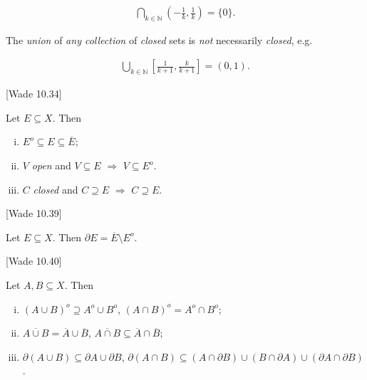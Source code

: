 \documentclass[10pt]{article} %
\newcommand{\cw}[1]{[Wade #1]}
\begin{document}
\begin{multicols}{3}
\begin{remark}{10.32}{}
        \begin{align*}
            \bigcap_{k \in \mathbb{N}} \left(-\frac{1}{k},\frac{1}{k}\right) = \{0\}.
        \end{align*}

    The \emph{union} of \emph{any collection} of \emph{closed} sets is \emph{not} necessarily \emph{closed}, e.g.

        \begin{align*}
            \bigcup_{k \in \mathbb{N}} \left[\frac{1}{k + 1},\frac{k}{k + 1}\right] = (0,1).
        \end{align*}

\end{remark}

\begin{theorem}{\cw{10.34}}{}

    Let $E \subseteq X$. Then

        \begin{enumerate}[i)]
            \setlength{\parskip}{0em}
            \item $E^o \subseteq E \subseteq \overline{E}$;
            \item $V$ \emph{open} and $V \subseteq E$ $\Rightarrow$ $V \subseteq E^o$.
            \item $C$ \emph{closed} and $C \supseteq E$ $\Rightarrow$ $C \supseteq E$.
        \end{enumerate}

\end{theorem}

\begin{theorem}{\cw{10.39}}{}

    Let $E \subseteq X$. Then $\partial E = \overline{E} \setminus E^o$.

\end{theorem}

\begin{theorem}{\cw{10.40}}{}

    Let $A,B \subseteq X$. Then

        \begin{enumerate}[i)]
            \setlength{\parskip}{0em}
            \item $(A \cup B)^o \supseteq A^o \cup B^o$, $(A \cap B)^o = A^o \cap B^o$;
            \item $\overline{A \cup B} = \overline{A} \cup \overline{B}$, $\overline{A \cap B} \subseteq \overline{A} \cap \overline{B}$;
            \item $\partial (A \cup B) \subseteq \partial A \cup \partial B$, $\partial (A \cap B) \subseteq (A \cap \partial B) \cup (B \cap \partial A) \cup (\partial A \cap \partial B)$.
        \end{enumerate}


\end{theorem}
\end{multicols}
\end{document}
